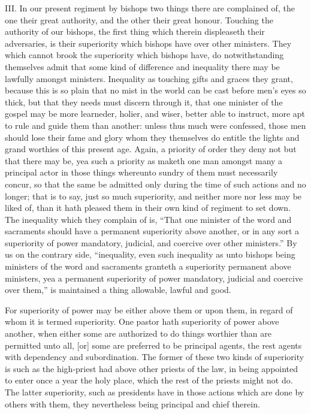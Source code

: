 III. In our present regiment by bishops two things there are complained of, the one their great authority, and the other their great honour. Touching the authority of our bishops, the first thing which therein displeaseth their adversaries, is their superiority which bishops have over other ministers. They which cannot brook the superiority which bishops have, do notwithstanding themselves admit that some kind of difference and inequality there may be lawfully amongst ministers. Inequality as touching gifts and graces they grant, because this is so plain that no mist in the world can be cast before men’s eyes so thick, but that they needs must discern through it, that one minister of the gospel may be more learneder, holier, and wiser, better able to instruct, more apt to rule and guide them than another: unless thus much were confessed, those men should lose their fame and glory whom they themselves do entitle the lights and grand worthies of this present age. Again, a priority of order they deny not but that there may be, yea such a priority as maketh one man amongst many a principal actor in those things whereunto sundry of them must necessarily concur, so that the same be admitted only during the time of such actions and no longer; that is to say, just so much superiority, and neither more nor less may be liked of, than it hath pleased them in their own kind of regiment to set down. The inequality which they complain of is, “That one minister of the word and sacraments should have a permanent superiority above another, or in any sort a superiority of power mandatory, judicial, and coercive over other ministers.” By us on the contrary side, “inequality, even such inequality as unto bishops being ministers of the word and sacraments granteth a superiority permanent above ministers, yea a permanent superiority of power mandatory, judicial and coercive over them,” is maintained a thing allowable, lawful and good.

For superiority of power may be either above them or upon them, in regard of whom it is termed superiority. One pastor hath superiority of power above another, when either some are authorized to do things worthier than are permitted unto all, [or] some are preferred to be principal agents, the rest agents with dependency and subordination. The former of these two kinds of superiority is such as the high-priest had above other priests of the law, in being appointed to enter once a year the holy place, which the rest of the priests might not do. The latter superiority, such as presidents have in those actions which are done by others with them, they nevertheless being principal and chief therein.

